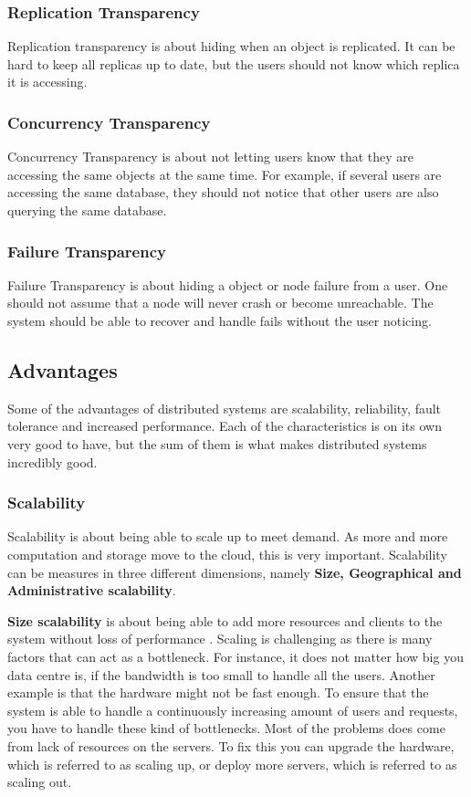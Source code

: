 \subsubsection{Replication Transparency}
Replication transparency is about hiding when an object is replicated. It can be hard to keep all replicas up to date, but the users should not know which replica it is accessing.

\subsubsection{Concurrency Transparency}
Concurrency Transparency is about not letting users know that they are accessing the same objects at the same time. For example, if several users are accessing the same database, they should not notice that other users are also querying the same database.

\subsubsection{Failure Transparency}
Failure Transparency is about hiding a object or node failure from a user. One should not assume that a node will  never crash or become unreachable. The system should be able to recover and handle fails without the user noticing.


\subsection{Advantages}
Some of the advantages of distributed systems are scalability, reliability, fault tolerance and increased performance. Each of the characteristics is on its own very good to have, but the sum of them is what makes distributed systems incredibly good.

\subsubsection{Scalability}
Scalability is about being able to scale up to meet demand. As more and more computation and storage move to the cloud, this is very important. Scalability can be measures in three different dimensions, namely \textbf{Size, Geographical and Administrative scalability}.

\textbf{Size scalability} is about being able to add more resources and clients to the system without loss of performance \cite{steen_distributed_2017}. Scaling is challenging as there is many factors that can act as a bottleneck. For instance, it does not matter how big you data centre is, if the bandwidth  is too small to handle all the users. Another example is that the hardware might not be fast enough. To ensure that the system is able to handle a continuously increasing amount of users and requests, you have to handle these kind of bottlenecks. Most of the problems does come from lack of resources on the servers. To fix this you can upgrade the hardware, which is referred to as scaling up, or deploy more servers, which is referred to as scaling out.

